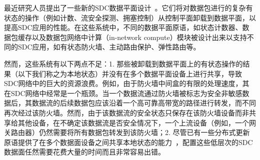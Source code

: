 最近研究人员提出了一些新的SDC数据平面设计~\cite{bianchi2014openstate, opensdc}。它们将对数据包进行的复杂有状态的操作（例如计数、流安全探测、拥塞控制）从控制平面卸载到数据平面，以提高SDC应用的性能。在这些系统中，不同的数据平面原语，如状态计数器、数据包缓存以及数据包网络中计算（in-network compute）模块被设计出来以支持不同的SDC应用，如有状态防火墙、主动路由保护、弹性路由等。


然而，这些系统有以下两点不足：1. 那些被卸载到数据平面上的有状态操作的结果（以下我们称之为本地状态）并没有在多个数据平面设备上进行共享，导致SDC网络中的巨大的资源浪费。例如，由于防火墙中间盒的有限的处理速度，其在SDC网络中经常是一个瓶颈。当一个数据流通过防火墙被标志为安全非敏感数据后，其数据流的后续数据包应该沿着一个高可靠高带宽的路径进行转发，而不同再次经过该防火墙。然而，由于该数据流的安全状态只保存在该防火墙设备而非共享给其他设备，在不确定该数据流是否安全情况下，一个上流设备（例如，一个网关路由器）仍然需要将所有数据包转发到该防火墙；2. 尽管已有一些分布式更新原语提供了在多个数据面设备之间共享本地状态的能力~\cite{ddp}，配置这些低层次的SDC数据面任然需要花费大量的时间而且非常容易出错。


